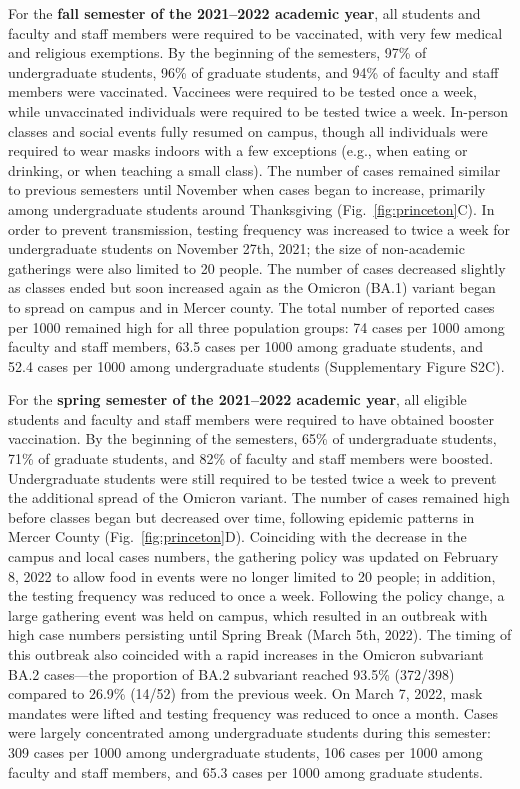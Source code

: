 \documentclass[12pt]{article}
\newcommand{\fref}[1]{Fig.~\ref{fig:#1}}
\begin{document}
For the \textbf{fall semester of the 2021--2022 academic year}, all students and faculty and staff members were required to be vaccinated, with very few medical and religious exemptions.
By the beginning of the semesters, 97\% of undergraduate students, 96\% of graduate students, and 94\% of faculty and staff members were vaccinated.
Vaccinees were required to be tested once a week, while unvaccinated individuals were required to be tested twice a week.
In-person classes and social events fully resumed on campus, though all individuals were required to wear masks indoors with a few exceptions (e.g., when eating or drinking, or when teaching a small class).
The number of cases remained similar to previous semesters until November when cases began to increase, primarily among undergraduate students around Thanksgiving (\fref{princeton}C).  
In order to prevent transmission, testing frequency was increased to twice a week for undergraduate students on November 27th, 2021; the size of non-academic gatherings were also limited to 20 people.
The number of cases decreased slightly as classes ended but soon increased again as the Omicron (BA.1) variant began to spread on campus and in Mercer county.
The total number of reported cases per 1000 remained high for all three population groups: 74 cases per 1000 among faculty and staff members, 63.5 cases per 1000 among graduate students, and 52.4 cases per 1000 among undergraduate students (Supplementary Figure S2C).

For the \textbf{spring semester of the 2021--2022 academic year}, all eligible students and faculty and staff members were required to have obtained booster vaccination.
By the beginning of the semesters, 65\% of undergraduate students, 71\% of graduate students, and 82\% of faculty and staff members were boosted.
Undergraduate students were still required to be tested twice a week to prevent the additional spread of the Omicron variant.
The number of cases remained high before classes began but decreased over time, following epidemic patterns in Mercer County (\fref{princeton}D).
Coinciding with the decrease in the campus and local cases numbers, the gathering policy was updated on February 8, 2022 to allow food in events were no longer limited to 20 people;
in addition, the testing frequency was reduced to once a week.
Following the policy change, a large gathering event was held on campus, which resulted in an outbreak with high case numbers persisting until Spring Break (March 5th, 2022).
The timing of this outbreak also coincided with a rapid increases in the Omicron subvariant BA.2 cases---the proportion of BA.2 subvariant reached 93.5\% (372/398) compared to 26.9\% (14/52) from the previous week.
On March 7, 2022, mask mandates were lifted and testing frequency was reduced to once a month.
Cases were largely concentrated among undergraduate students during this semester: 309 cases per 1000 among undergraduate students, 106 cases per 1000 among faculty and staff members, and 65.3 cases per 1000 among graduate students.
\end{document}
